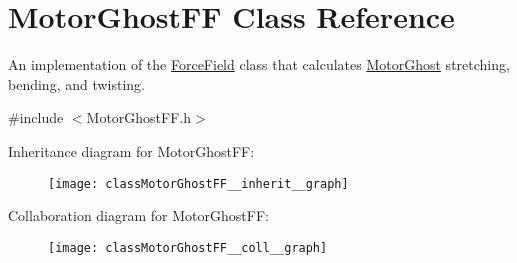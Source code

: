 \hypertarget{classMotorGhostFF}{\section{Motor\+Ghost\+F\+F Class Reference}
\label{classMotorGhostFF}
}


An implementation of the \hyperlink{classForceField}{Force\+Field} class that calculates \hyperlink{classMotorGhost}{Motor\+Ghost} stretching, bending, and twisting.  




{\ttfamily \#include $<$Motor\+Ghost\+F\+F.\+h$>$}



Inheritance diagram for Motor\+Ghost\+F\+F\+:\nopagebreak
\begin{figure}[H]
\begin{center}
\leavevmode
\texttt{[image: classMotorGhostFF\_\_inherit\_\_graph]}
\end{center}
\end{figure}


Collaboration diagram for Motor\+Ghost\+F\+F\+:\nopagebreak
\begin{figure}[H]
\begin{center}
\leavevmode
\texttt{[image: classMotorGhostFF\_\_coll\_\_graph]}
\end{center}
\end{figure}
